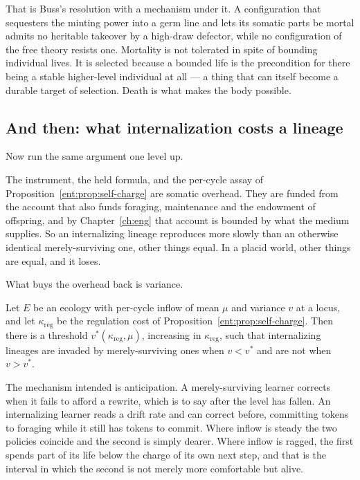 That is Buss's resolution with a mechanism under it.
A configuration that sequesters the minting power into a germ line and
lets its somatic parts be mortal admits no heritable takeover by a
high-draw defector, while no configuration of the free theory resists
one.
Mortality is not tolerated in spite of bounding individual lives.
It is selected because a bounded life is the precondition for there being
a stable higher-level individual at all --- a thing that can itself become
a durable target of selection.
Death is what makes the body possible.

\subsection{And then: what internalization costs a lineage}
\label{suf:S5.2}

Now run the same argument one level up.

The instrument, the held formula, and the per-cycle assay of
Proposition~\ref{ent:prop:self-charge} are somatic overhead.
They are funded from the account that also funds foraging, maintenance
and the endowment of offspring, and by Chapter~\ref{ch:eng} that account
is bounded by what the medium supplies.
So an internalizing lineage reproduces more slowly than an otherwise
identical merely-surviving one, other things equal.
In a placid world, other things are equal, and it loses.

What buys the overhead back is variance.

\begin{conjecture}
\label{suf:conj:selected}
Let $E$ be an ecology with per-cycle inflow of mean $\mu$ and variance
$v$ at a locus, and let $\kappa_{\mathrm{reg}}$ be the regulation cost of
Proposition~\ref{ent:prop:self-charge}.
Then there is a threshold $v^\ast(\kappa_{\mathrm{reg}}, \mu)$, increasing
in $\kappa_{\mathrm{reg}}$, such that internalizing lineages are invaded
by merely-surviving ones when $v < v^\ast$ and are not when $v > v^\ast$.
\end{conjecture}

The mechanism intended is anticipation.
A merely-surviving learner corrects when it fails to afford a rewrite,
which is to say after the level has fallen.
An internalizing learner reads a drift rate and can correct before,
committing tokens to foraging while it still has tokens to commit.
Where inflow is steady the two policies coincide and the second is simply
dearer.
Where inflow is ragged, the first spends part of its life below the
charge of its own next step, and that is the interval in which the second
is not merely more comfortable but alive.

